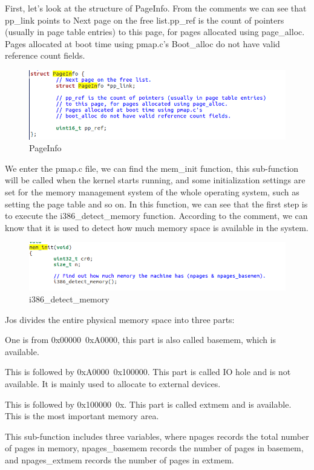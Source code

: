 First, let's look at the structure of PageInfo. From the comments we can see that pp\_link points to Next page on the free list.pp\_ref is the count of pointers (usually in page table entries) to this page, for pages allocated using page\_alloc. Pages allocated at boot time using pmap.c's
Boot\_alloc do not have valid reference count fields.
\begin{figure}[H]
\centering
\includegraphics[width=0.8\linewidth]{figure/PageInfo}
\caption{PageInfo}
\end{figure}

We enter the pmap.c file, we can find the mem\_init function, this sub-function will be called when the kernel starts running, and some initialization settings are set for the memory management system of the whole operating system, such as setting the page table and so on. In this function, we can see that the first step is to execute the i386\_detect\_memory function. According to the comment, we can know that it is used to detect how much memory space is available in the system.
\begin{figure}[H]
\centering
\includegraphics[width=0.8\linewidth]{figure/i386_detect_memory}
\caption{i386\_detect\_memory}
\end{figure}

Jos divides the entire physical memory space into three parts:

One is from 0x00000~0xA0000, this part is also called basemem, which is available.

This is followed by 0xA0000~0x100000. This part is called IO hole and is not available. It is mainly used to allocate to external devices.

This is followed by 0x100000~0x. This part is called extmem and is available. This is the most important memory area.

This sub-function includes three variables, where npages records the total number of pages in memory, npages\_basemem records the number of pages in basemem, and npages\_extmem records the number of pages in extmem.

